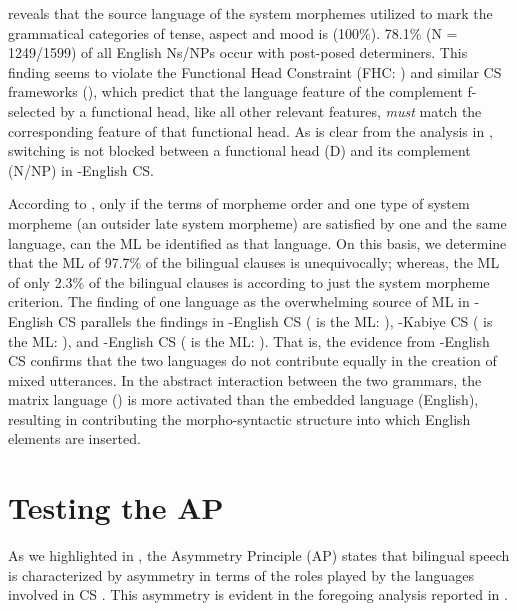 \documentclass[output=paper]{langsci/langscibook}
\begin{document}
 reveals that the source language of the system morphemes utilized to mark the grammatical categories of tense, aspect and mood is  (100\%). 78.1\% (N = 1249/1599) of all English Ns/NPs occur with post-posed  determiners. This finding seems to violate the Functional Head Constraint (FHC: \citealt{BelaziEtAl1994}) and similar CS frameworks (), which predict that the language feature of the complement f-selected by a functional head, like all other relevant features, \textit{must} match the corresponding feature of that functional head. As is clear from the analysis in , switching is not blocked between a functional head (D) and its complement (N/NP) in -English CS. 

According to \citet[59]{MyersScotton2002}, only if the terms of morpheme order and one type of system morpheme (an outsider late system morpheme) are satisfied by one and the same language, can the ML be identified as that language. On this basis, we determine that the ML of 97.7\% of the bilingual clauses is  unequivocally; whereas, the ML of only 2.3\% of the bilingual clauses is  according to just the system morpheme criterion. The finding of one language as the overwhelming source of ML in -English CS parallels the findings in -English CS ( is the ML: \citealt{Bolonyai2005}), -Kabiye CS ( is the ML: \citealt{Essizewa2007}), and -English CS ( is the ML: \citealt{DaviesDeuchar2010}). That is, the evidence from -English CS confirms that the two languages do not contribute equally in the creation of mixed utterances. In the abstract interaction between the two grammars, the matrix language () is more activated than the embedded language (English), resulting in  contributing the morpho-syntactic structure into which English elements are inserted.  

\section{Testing the AP}\label{sec:ihemere:6}

As we highlighted in , the Asymmetry Principle (AP) states that bilingual speech is characterized by asymmetry in terms of the roles played by the languages involved in CS \citep[9]{MyersScotton2002}. This asymmetry is evident in the foregoing analysis reported in . 
\end{document}
